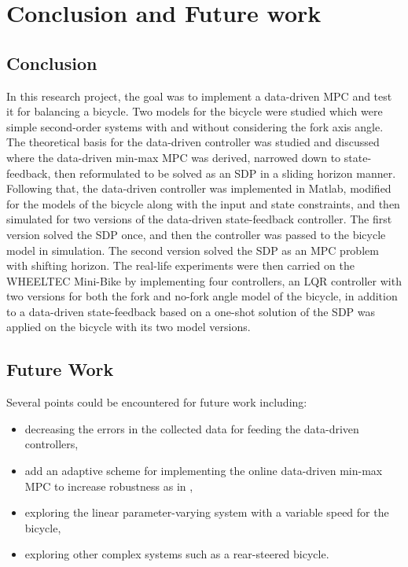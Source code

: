 \chapter{Conclusion and Future work}
\label{chap:conclusion}

\section{Conclusion}
In this research project, the goal was to implement a data-driven MPC and test it for balancing a bicycle. Two models for the bicycle were studied which were simple second-order systems with and without considering the fork axis angle. The theoretical basis for the data-driven controller was studied and discussed where the data-driven min-max MPC was derived, narrowed down to state-feedback, then reformulated to be solved as an SDP in a sliding horizon manner. Following that, the data-driven controller was implemented in Matlab, modified for the models of the bicycle along with the input and state constraints, and then simulated for two versions of the data-driven state-feedback controller. The first version solved the SDP once, and then the controller was passed to the bicycle model in simulation. The second version solved the SDP as an MPC problem with shifting horizon. The real-life experiments were then carried on the WHEELTEC Mini-Bike by implementing four controllers, an LQR controller with two versions for both the fork and no-fork angle model of the bicycle, in addition to a data-driven state-feedback based on a one-shot solution of the SDP was applied on the bicycle with its two model versions.

\section{Future Work}
Several points could be encountered for future work including:
\begin{itemize}
	\item decreasing the errors in the collected data for feeding the data-driven controllers,
	\item add an adaptive scheme for implementing the online data-driven min-max MPC to increase robustness as in \cite{xie2024robust},
	\item exploring the linear parameter-varying system with a variable speed for the bicycle,
	\item exploring other complex systems such as a rear-steered bicycle.
\end{itemize}
